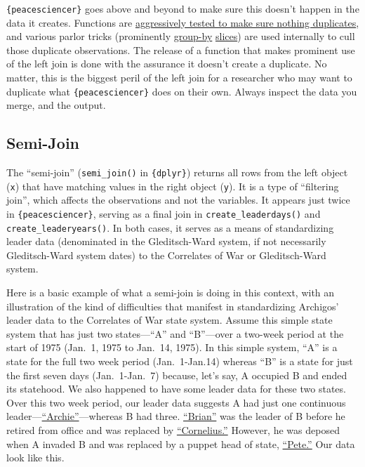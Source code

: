 \documentclass[
  11pt,
]{article}
\begin{document}
\texttt{\{peacesciencer\}} goes above and beyond to make sure this doesn't happen in the data it creates. Functions are \href{https://github.com/svmiller/peacesciencer/blob/master/tests/testthat/test_nodamnduplicates.R}{aggressively tested to make sure nothing duplicates}, and various parlor tricks (prominently \href{https://dplyr.tidyverse.org/reference/group_by.html}{group-by} \href{https://dplyr.tidyverse.org/reference/slice.html}{slices}) are used internally to cull those duplicate observations. The release of a function that makes prominent use of the left join is done with the assurance it doesn't create a duplicate. No matter, this is the biggest peril of the left join for a researcher who may want to duplicate what \texttt{\{peacesciencer\}} does on their own. Always inspect the data you merge, and the output.

\hypertarget{semi-join}{%
\subsection{Semi-Join}\label{semi-join}}

The ``semi-join'' (\texttt{semi\_join()} in \texttt{\{dplyr\}}) returns all rows from the left object (\texttt{x}) that have matching values in the right object (\texttt{y}). It is a type of ``filtering join'', which affects the observations and not the variables. It appears just twice in \texttt{\{peacesciencer\}}, serving as a final join in \texttt{create\_leaderdays()} and \texttt{create\_leaderyears()}. In both cases, it serves as a means of standardizing leader data (denominated in the Gleditsch-Ward system, if not necessarily Gleditsch-Ward system dates) to the Correlates of War or Gleditsch-Ward system.

Here is a basic example of what a semi-join is doing in this context, with an illustration of the kind of difficulties that manifest in standardizing Archigos' leader data to the Correlates of War state system. Assume this simple state system that has just two states---``A'' and ``B''---over a two-week period at the start of 1975 (Jan.~1, 1975 to Jan.~14, 1975). In this simple system, ``A'' is a state for the full two week period (Jan.~1-Jan.14) whereas ``B'' is a state for just the first seven days (Jan.~1-Jan.~7) because, let's say, A occupied B and ended its statehood. We also happened to have some leader data for these two states. Over this two week period, our leader data suggests A had just one continuous leader---\href{https://en.wikipedia.org/wiki/Archie_Griffin}{``Archie''}---whereas B had three. \href{https://en.wikipedia.org/wiki/Brian_Baschnagel}{``Brian''} was the leader of B before he retired from office and was replaced by \href{https://en.wikipedia.org/wiki/Cornelius_Greene}{``Cornelius.''} However, he was deposed when A invaded B and was replaced by a puppet head of state, \href{https://en.wikipedia.org/wiki/Pete_Johnson_(American_football)}{``Pete.''} Our data look like this.
\end{document}
